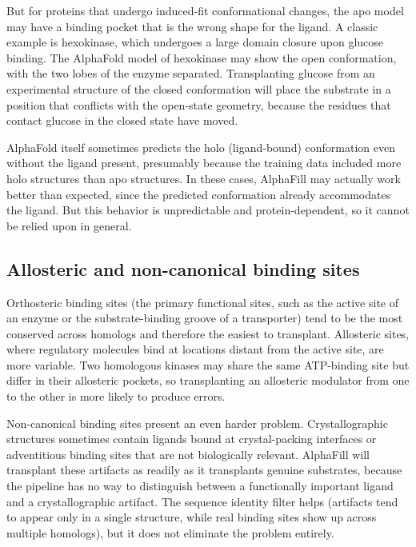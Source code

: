 But for proteins that undergo induced-fit conformational changes, the apo model may have a binding pocket that is the wrong shape for the ligand. A classic example is hexokinase, which undergoes a large domain closure upon glucose binding. The AlphaFold model of hexokinase may show the open conformation, with the two lobes of the enzyme separated. Transplanting glucose from an experimental structure of the closed conformation will place the substrate in a position that conflicts with the open-state geometry, because the residues that contact glucose in the closed state have moved.

AlphaFold itself sometimes predicts the holo (ligand-bound) conformation even without the ligand present, presumably because the training data included more holo structures than apo structures. In these cases, AlphaFill may actually work better than expected, since the predicted conformation already accommodates the ligand. But this behavior is unpredictable and protein-dependent, so it cannot be relied upon in general.

\subsection{Allosteric and non-canonical binding sites}
\label{sec:allosteric}

Orthosteric binding sites (the primary functional sites, such as the active site of an enzyme or the substrate-binding groove of a transporter) tend to be the most conserved across homologs and therefore the easiest to transplant. Allosteric sites, where regulatory molecules bind at locations distant from the active site, are more variable. Two homologous kinases may share the same ATP-binding site but differ in their allosteric pockets, so transplanting an allosteric modulator from one to the other is more likely to produce errors.

Non-canonical binding sites present an even harder problem. Crystallographic structures sometimes contain ligands bound at crystal-packing interfaces or adventitious binding sites that are not biologically relevant. AlphaFill will transplant these artifacts as readily as it transplants genuine substrates, because the pipeline has no way to distinguish between a functionally important ligand and a crystallographic artifact. The sequence identity filter helps (artifacts tend to appear only in a single structure, while real binding sites show up across multiple homologs), but it does not eliminate the problem entirely.

